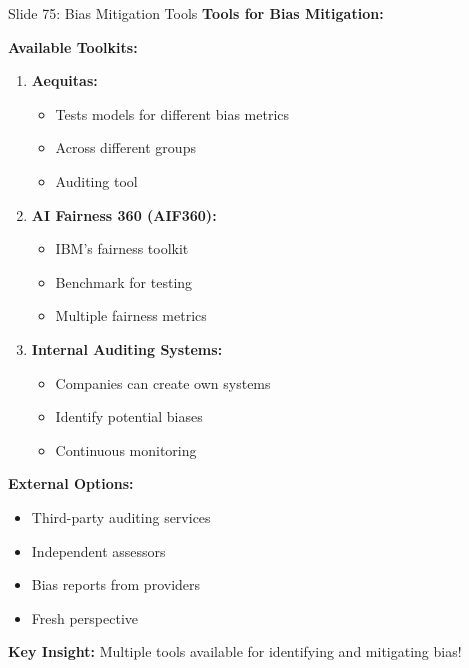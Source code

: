 \documentclass[8pt]{beamer}
\begin{document}
	\begin{frame}{Slide 75: Bias Mitigation Tools}
		\fontsize{6.5}{7.5}\selectfont
		\textbf{Tools for Bias Mitigation:}
		
		\vspace{0.1cm}
		\textbf{Available Toolkits:}
		\begin{enumerate}
			\item \textbf{Aequitas:}
			\begin{itemize}
				\item Tests models for different bias metrics
				\item Across different groups
				\item Auditing tool
			\end{itemize}
			\item \textbf{AI Fairness 360 (AIF360):}
			\begin{itemize}
				\item IBM's fairness toolkit
				\item Benchmark for testing
				\item Multiple fairness metrics
			\end{itemize}
			\item \textbf{Internal Auditing Systems:}
			\begin{itemize}
				\item Companies can create own systems
				\item Identify potential biases
				\item Continuous monitoring
			\end{itemize}
		\end{enumerate}
		
		\vspace{0.1cm}
		\textbf{External Options:}
		\begin{itemize}
			\item Third-party auditing services
			\item Independent assessors
			\item Bias reports from providers
			\item Fresh perspective
		\end{itemize}
		
		\textcolor{myblue}{\textbf{Key Insight:}} Multiple tools available for \textcolor{myblue}{identifying and mitigating bias}!
	\end{frame}
	
	
\end{document}
